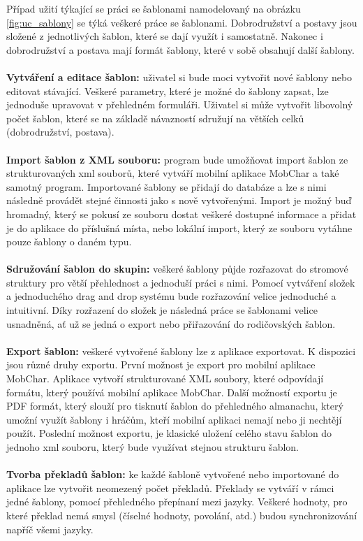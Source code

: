 \documentclass[thesis=B,czech]{resources/FITthesis}[2012/06/26]
\begin{document}
Případ užití týkající se práci se šablonami namodelovaný na obrázku \ref{fig:uc_sablony} se týká veškeré práce se šablonami. Dobrodružství a postavy jsou složené z jednotlivých šablon, které se dají využít i samostatně. Nakonec i dobrodružství a postava mají formát šablony, které v sobě obsahují další šablony.\\
\\
\textbf{Vytváření a editace šablon:} uživatel si bude moci vytvořit nové šablony nebo editovat stávající. Veškeré parametry, které je možné do šablony zapsat, lze jednoduše upravovat v přehledném formuláři. Uživatel si může vytvořit libovolný počet šablon, které se na základě návazností sdružují na větších celků (dobrodružství, postava).\\
\\
\textbf{Import šablon z XML souboru:} program bude umožňovat import šablon ze strukturovaných xml souborů, které vytváří mobilní aplikace MobChar a také samotný program. Importované šablony se přidají do databáze a lze s nimi následně provádět stejné činnosti jako s nově vytvořenými. Import je možný buď hromadný, který se pokusí ze souboru dostat veškeré dostupné informace a přidat je do aplikace do příslušná místa, nebo lokální import, který ze souboru vytáhne pouze šablony o daném typu.\\
\\
\textbf{Sdružování šablon do skupin:} veškeré šablony půjde rozřazovat do stromové struktury pro větší přehlednost a jednoduší práci s nimi. Pomocí vytváření složek a jednoduchého drag and drop systému bude rozřazování velice jednoduché a intuitivní. Díky rozřazení do složek je následná práce se šablonami velice usnadněná, ať už se jedná o export nebo přiřazování do rodičovských šablon.\\
\\
\textbf{Export šablon:} veškeré vytvořené šablony lze z aplikace exportovat. K dispozici jsou různé druhy exportu. První možnost je export pro mobilní aplikace MobChar. Aplikace vytvoří strukturované XML soubory, které odpovídají formátu, který používá mobilní aplikace MobChar. Další možností exportu je PDF formát, který slouží pro tisknutí šablon do přehledného almanachu, který umožní využít šablony i hráčům, kteří mobilní aplikaci nemají nebo ji nechtějí použít. Poslední možnost exportu, je klasické uložení celého stavu šablon do jednoho xml souboru, který bude využívat stejnou strukturu šablon. \\
\\
\textbf{Tvorba překladů šablon:} ke každé šabloně vytvořené nebo importované do aplikace lze vytvořit neomezený počet překladů. Překlady se vytváří v rámci jedné šablony, pomocí přehledného přepínaní mezi jazyky. Veškeré hodnoty, pro které překlad nemá smysl (číselné hodnoty, povolání, atd.) budou synchronizování napříč všemi jazyky.\\
\\
\end{document}

